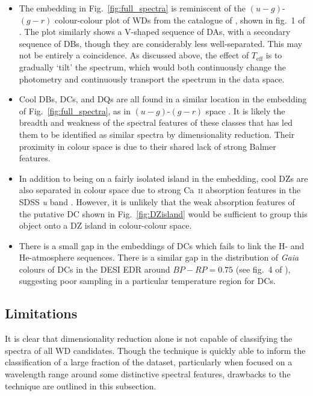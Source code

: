 \documentclass[fleqn,usenatbib]{mnras}
\def\Teff{T_\mathrm{eff}}
\begin{document}
\begin{itemize}
\item
The embedding in Fig.~\ref{fig:full_spectra} is reminiscent of the $(u-g)$-$(g-r)$ colour-colour plot of WDs from the catalogue of \citet{gentilefusillo19}, shown in fig.~1 of \citet{manser20}.
The plot similarly shows a V-shaped sequence of DAs, with a secondary sequence of DBs, though they are considerably less well-separated.
This may not be entirely a coincidence.
As discussed above, the effect of $\Teff$ is to gradually `tilt' the spectrum, which would both continuously change the photometry and continuously transport the spectrum in the data space.
\item
Cool DBs, DCs, and DQs are all found in a similar location in the embedding of Fig.~\ref{fig:full_spectra}, as in $(u-g)$-$(g-r)$ space \citep{manser20}.
It is likely the breadth and weakness of the spectral features of these classes that has led them to be identified as similar spectra by dimensionality reduction.
Their proximity in colour space is due to their shared lack of strong Balmer features.
\item
In addition to being on a fairly isolated island in the embedding, cool DZs are also separated in colour space due to strong Ca~\textsc{ii} absorption features in the SDSS \textit{u} band \citep{hollands15}.
However, it is unlikely that the weak absorption features of the putative DC shown in Fig.~\ref{fig:DZisland} would be sufficient to group this object onto a DZ island in colour-colour space.
\item
There is a small gap in the embeddings of DCs which fails to link the H- and He-atmosphere sequences.
There is a similar gap in the distribution of \textit{Gaia} colours of DCs in the DESI EDR around $\mathit{BP}-\mathit{RP}=0.75$ (see fig.~4 of \citealt{manser24}), suggesting poor sampling in a particular temperature region for DCs.
\end{itemize}



\subsection{Limitations}

It is clear that dimensionality reduction alone is not capable of classifying the spectra of all WD candidates.
Though the technique is quickly able to inform the classification of a large fraction of the dataset, particularly when focused on a wavelength range around some distinctive spectral features, drawbacks to the technique are outlined in this subsection.
\end{document}
